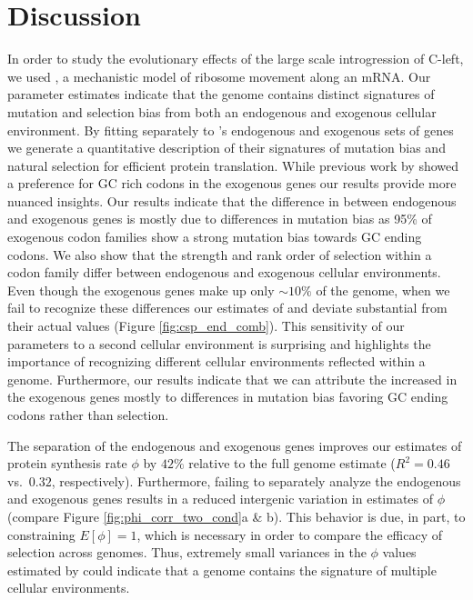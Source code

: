 \documentclass[fleqn,letterpaper]{article}
\begin{document}

\section*{Discussion}
In order to study the evolutionary effects of the large scale introgression of C-left, we used \ROC, a mechanistic model of ribosome movement along an mRNA.
Our parameter estimates indicate that the \kluyveri genome contains distinct signatures of mutation and selection bias from both an endogenous and exogenous cellular environment.
By fitting \ROC separately to \kluyveri's endogenous and exogenous sets of genes we generate a quantitative description of their signatures of mutation bias and natural selection for efficient protein translation.
While previous work by \citet{payen2009} showed a preference for GC rich codons in the exogenous genes our results provide more nuanced insights.
Our results indicate that the difference in \GC between endogenous and exogenous genes is mostly due to differences in mutation bias as 95\% of exogenous codon families show a strong mutation bias towards GC ending codons.
We also show that the strength and rank order of selection within a codon family differ between endogenous and exogenous cellular environments.   
Even though the exogenous genes make up only $\sim10\%$ of the \kluyveri genome, when we fail to recognize these differences our estimates of \DM and \DE deviate substantial from their actual values (Figure \ref{fig:csp_end_comb}).
This sensitivity of our parameters to a second cellular environment is surprising and highlights the importance of recognizing different cellular environments reflected within a genome.
Furthermore, our results indicate that we can attribute the increased \GC in the exogenous genes mostly to differences in mutation bias favoring GC ending codons rather than selection.

The separation of the endogenous and exogenous genes improves our estimates of protein synthesis rate $\phi$ by $42 \%$ relative to the full genome estimate ($R^2 = 0.46$ vs.~$0.32$, respectively).
Furthermore, failing to separately analyze the endogenous and exogenous genes results in a reduced intergenic variation in \ROC estimates of $\phi$ (compare Figure \ref{fig:phi_corr_two_cond}a \& b).
This behavior is due, in part, to constraining $E[\phi] = 1$, which is necessary in order to compare the efficacy of selection across genomes.
Thus, extremely small variances in the $\phi$ values estimated by \ROC could indicate that a genome contains the signature of multiple cellular environments.
\end{document}
